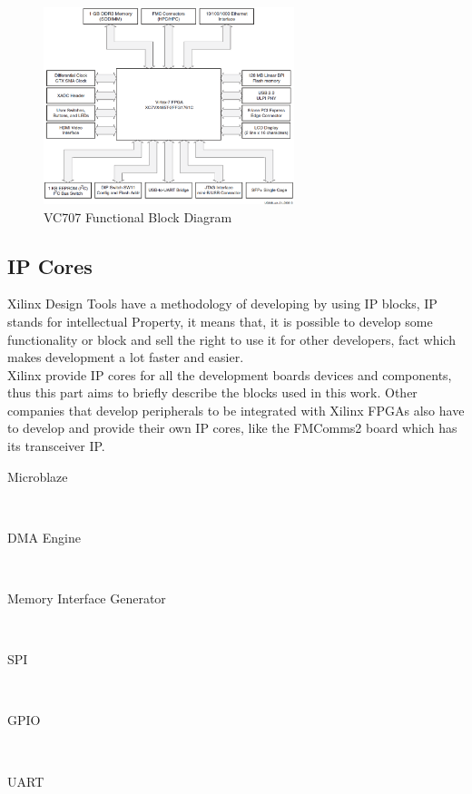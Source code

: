 \begin{figure}[htbp]
    \centering
    \includegraphics[width=0.65\textwidth]{./figures/vc707_bd}
    \caption{ VC707 Functional Block Diagram
    \label{fig:vc707bd}}
\end{figure}

\subsection{IP Cores}

Xilinx Design Tools have a methodology of developing by using IP blocks, IP
stands for intellectual Property, it means that, it is possible to develop some
functionality or block and sell the right to use it for other developers, fact
which makes development a lot faster and easier.\\

Xilinx provide IP cores for all the development boards devices and components,
thus this part aims to briefly describe the blocks used in this work. Other
companies that develop peripherals to be integrated with Xilinx FPGAs also have
to develop and provide their own IP cores, like the FMComms2 board which has its
transceiver IP.


\begin{description}
	\item[Microblaze] \hfill \\

	\item[DMA Engine] \hfill \\

  \item[Memory Interface Generator] \hfill \\

  \item[SPI] \hfill \\

  \item[GPIO] \hfill \\

  \item[UART] \hfill \\

\end{description}


